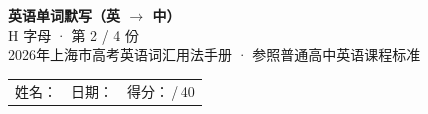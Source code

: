 \documentclass[10pt,a4paper]{article}
\begin{document}
\pagestyle{plain}

\begin{center}
{\LARGE\bfseries 英语单词默写（英 $\to$ 中）}\\[0.22em]
{\large H 字母 · 第 2 / 4 份}\\[0.18em]
{\small 2026年上海市高考英语词汇用法手册 · 参照普通高中英语课程标准}
\end{center}

\vspace{0.25em}
\noindent\begin{tabular}{@{}p{}@{}p{}@{}p{}@{}}
姓名：\underline{\hspace{2.0cm}} & 日期：\underline{\hspace{2.0cm}} & 得分：\underline{\hspace{1.3cm}}\,/\,40 \\
\end{tabular}

\vspace{0.3em}

\vspace{0.08em}
\end{document}
